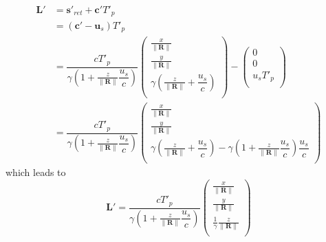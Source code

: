 \begin{equation}
	\begin{split}
		\mathbf{L}'
		 & = \mathbf{s}'_{ret} + \mathbf{c}'T'_{p}
		\\
		 & = \left( \mathbf{c}' - \mathbf{u}_s \right)T'_{p}
		\\
		 & = \dfrac{c T'_{p}}{\gamma\left(1 + \frac{z}{\|\mathbf{R}\|} \dfrac{u_s}{c}  \right)}
		\begin{pmatrix}
			\frac{x}{\|\mathbf{R}\|}                                        \\
			\frac{y}{\|\mathbf{R}\|}                                        \\
			\gamma \left( \frac{z}{\|\mathbf{R}\|} + \dfrac{u_s}{c} \right) \\
		\end{pmatrix}
		-
		\begin{pmatrix}
			0          \\
			0          \\
			u_s T'_{p} \\
		\end{pmatrix}
		\\
		 & = \dfrac{c T'_{p}}{\gamma\left(1 + \frac{z}{\|\mathbf{R}\|} \dfrac{u_s}{c}  \right)}
		\begin{pmatrix}
			\frac{x}{\|\mathbf{R}\|}                                                                                                                           \\
			\frac{y}{\|\mathbf{R}\|}                                                                                                                           \\
			\gamma \left( \frac{z}{\|\mathbf{R}\|} + \dfrac{u_s}{c} \right) - \gamma\left(1 + \frac{z}{\|\mathbf{R}\|} \dfrac{u_s}{c}  \right)  \dfrac{u_s}{c} \\
		\end{pmatrix}
	\end{split}
\end{equation}
which leads to
\begin{equation}
	\mathbf{L}' = \dfrac{c T'_{p}}{\gamma\left(1 + \frac{z}{\|\mathbf{R}\|} \dfrac{u_s}{c}  \right)}
	\begin{pmatrix}
		\frac{x}{\|\mathbf{R}\|}                  \\
		\frac{y}{\|\mathbf{R}\|}                  \\
		\frac{1}{\gamma} \frac{z}{\|\mathbf{R}\|} \\
	\end{pmatrix}
\end{equation}
